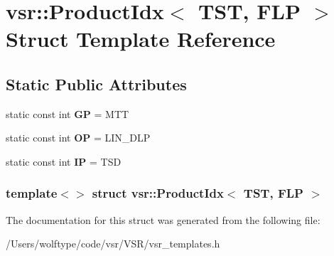 \hypertarget{structvsr_1_1_product_idx_3_01_t_s_t_00_01_f_l_p_01_4}{\section{vsr\-:\-:Product\-Idx$<$ T\-S\-T, F\-L\-P $>$ Struct Template Reference}
\label{structvsr_1_1_product_idx_3_01_t_s_t_00_01_f_l_p_01_4}
}
\subsection*{Static Public Attributes}
\begin{DoxyCompactItemize}
\item 
\hypertarget{structvsr_1_1_product_idx_3_01_t_s_t_00_01_f_l_p_01_4_a3d8ba97130188b0e16ffba282dfc9285}{static const int {\bfseries G\-P} = M\-T\-T}\label{structvsr_1_1_product_idx_3_01_t_s_t_00_01_f_l_p_01_4_a3d8ba97130188b0e16ffba282dfc9285}

\item 
\hypertarget{structvsr_1_1_product_idx_3_01_t_s_t_00_01_f_l_p_01_4_ab0ed3c17f8ea2cf7db95018044a8a74b}{static const int {\bfseries O\-P} = L\-I\-N\-\_\-\-D\-L\-P}\label{structvsr_1_1_product_idx_3_01_t_s_t_00_01_f_l_p_01_4_ab0ed3c17f8ea2cf7db95018044a8a74b}

\item 
\hypertarget{structvsr_1_1_product_idx_3_01_t_s_t_00_01_f_l_p_01_4_ae97cfcb8b4ae638c443280bd061f8a11}{static const int {\bfseries I\-P} = T\-S\-D}\label{structvsr_1_1_product_idx_3_01_t_s_t_00_01_f_l_p_01_4_ae97cfcb8b4ae638c443280bd061f8a11}

\end{DoxyCompactItemize}
\subsubsection*{template$<$$>$ struct vsr\-::\-Product\-Idx$<$ T\-S\-T, F\-L\-P $>$}



The documentation for this struct was generated from the following file\-:\begin{DoxyCompactItemize}
\item 
/\-Users/wolftype/code/vsr/\-V\-S\-R/vsr\-\_\-templates.\-h\end{DoxyCompactItemize}
